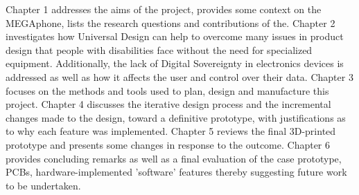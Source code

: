 Chapter 1 addresses the aims of the project, provides some context on the MEGAphone, lists the research questions and contributions of the.
Chapter 2 investigates how Universal Design can help to overcome many issues in product design that people with disabilities face without the need for specialized equipment. 
Additionally, the lack of Digital Sovereignty in electronics devices is addressed as well as how it affects the user and control over their data.
Chapter 3 focuses on the methods and tools used to plan, design and manufacture this project.
Chapter 4 discusses the iterative design process and the incremental changes made to the design, toward a definitive prototype, with justifications as to why each feature was implemented.
Chapter 5 reviews the final 3D-printed prototype and presents some changes in response to the outcome.
Chapter 6 provides concluding remarks as well as a final evaluation of the case prototype, PCBs, hardware-implemented 'software' features thereby suggesting future work to be undertaken.
